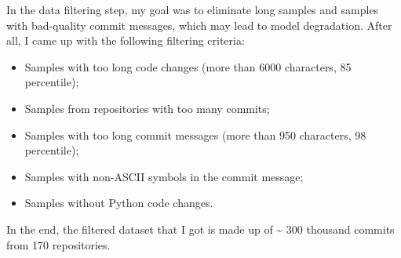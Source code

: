 In the data filtering step, my goal was to eliminate long samples and samples with bad-quality commit messages, which may lead to model degradation. After all, I came up with the following filtering criteria: 
\begin{itemize}
    \item Samples with too long code changes (more than 6000 characters, 85 percentile);
    \item Samples from repositories with too many commits;
    \item Samples with too long commit messages (more than 950 characters, 98 percentile);
    \item Samples with non-ASCII symbols in the commit message;
    \item Samples without Python code changes.
\end{itemize}
In the end, the filtered dataset that I got is made up of \textasciitilde{} 300 thousand commits from 170 repositories. 

